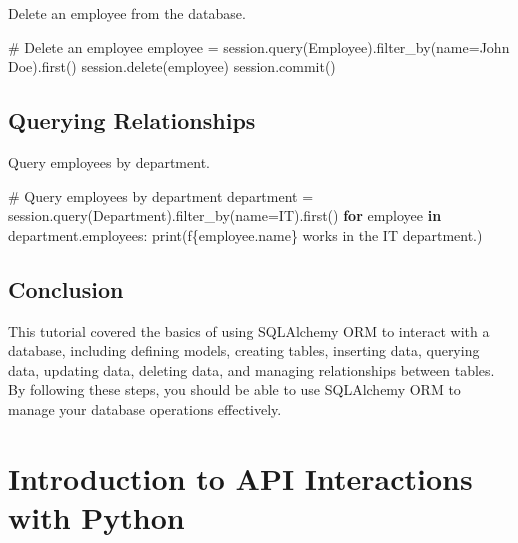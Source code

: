 \documentclass[
  letterpaper,
  DIV=11,
  numbers=noendperiod]{scrreprt}
\newenvironment{Shaded}{\begin{snugshade}}{\end{snugshade}}
\newcommand{\BuiltInTok}[1]{\textcolor[rgb]{0.00,0.23,0.31}{#1}}
\newcommand{\CommentTok}[1]{\textcolor[rgb]{0.37,0.37,0.37}{#1}}
\newcommand{\ControlFlowTok}[1]{\textcolor[rgb]{0.00,0.23,0.31}{\textbf{#1}}}
\newcommand{\KeywordTok}[1]{\textcolor[rgb]{0.00,0.23,0.31}{\textbf{#1}}}
\newcommand{\NormalTok}[1]{\textcolor[rgb]{0.00,0.23,0.31}{#1}}
\newcommand{\OperatorTok}[1]{\textcolor[rgb]{0.37,0.37,0.37}{#1}}
\newcommand{\SpecialCharTok}[1]{\textcolor[rgb]{0.37,0.37,0.37}{#1}}
\newcommand{\SpecialStringTok}[1]{\textcolor[rgb]{0.13,0.47,0.30}{#1}}
\newcommand{\StringTok}[1]{\textcolor[rgb]{0.13,0.47,0.30}{#1}}
\begin{document}
Delete an employee from the database.

\begin{Shaded}
\begin{Highlighting}[]
\CommentTok{\# Delete an employee}
\NormalTok{employee }\OperatorTok{=}\NormalTok{ session.query(Employee).filter\_by(name}\OperatorTok{=}\StringTok{\textquotesingle{}John Doe\textquotesingle{}}\NormalTok{).first()}
\NormalTok{session.delete(employee)}
\NormalTok{session.commit()}
\end{Highlighting}
\end{Shaded}

\section{Querying Relationships}\label{querying-relationships-1}

Query employees by department.

\begin{Shaded}
\begin{Highlighting}[]
\CommentTok{\# Query employees by department}
\NormalTok{department }\OperatorTok{=}\NormalTok{ session.query(Department).filter\_by(name}\OperatorTok{=}\StringTok{\textquotesingle{}IT\textquotesingle{}}\NormalTok{).first()}
\ControlFlowTok{for}\NormalTok{ employee }\KeywordTok{in}\NormalTok{ department.employees:}
    \BuiltInTok{print}\NormalTok{(}\SpecialStringTok{f\textquotesingle{}}\SpecialCharTok{\{}\NormalTok{employee}\SpecialCharTok{.}\NormalTok{name}\SpecialCharTok{\}}\SpecialStringTok{ works in the IT department.\textquotesingle{}}\NormalTok{)}
\end{Highlighting}
\end{Shaded}

\section{Conclusion}\label{conclusion-16}

This tutorial covered the basics of using SQLAlchemy ORM to interact
with a database, including defining models, creating tables, inserting
data, querying data, updating data, deleting data, and managing
relationships between tables. By following these steps, you should be
able to use SQLAlchemy ORM to manage your database operations
effectively.


\chapter{Introduction to API Interactions with
Python}\label{introduction-to-api-interactions-with-python}
\end{document}
